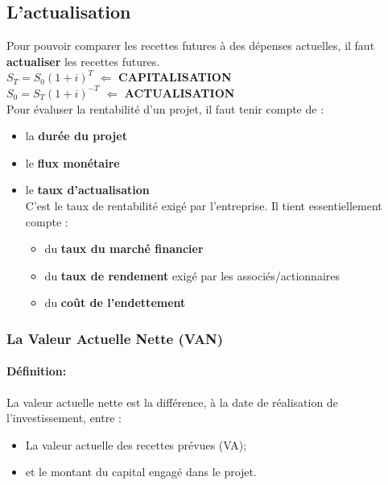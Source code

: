 \documentclass{article}
\begin{document}
\subsection{L'actualisation}
Pour pouvoir comparer les recettes futures à des dépenses actuelles, il faut \textbf{actualiser} les recettes futures.\\

$S_{T} = S_{0}(1+i)^{T}$ $\Longleftarrow$ \textbf{CAPITALISATION}\\
$S_{0} = S_{T}(1+i)^{-T}$ $\Longleftarrow$ \textbf{ACTUALISATION}\\

Pour évaluser la rentabilité d'un projet, il faut tenir compte de :
\begin{itemize}
	\item la \textbf{durée du projet}
	
	\item le \textbf{flux monétaire}
	
	\item le \textbf{taux d'actualisation}\\
	C'est le taux de rentabilité exigé par l'entreprise. Il tient essentiellement compte :
	\begin{itemize}
		\item du \textbf{taux du marché financier}
		\item du \textbf{taux de rendement} exigé par les associés/actionnaires
		\item du \textbf{co\^ut de l'endettement}
	\end{itemize}
\end{itemize}

\subsubsection{La Valeur Actuelle Nette (VAN)}

\paragraph{Définition:} La valeur actuelle nette est la différence, à la date de réalisation de l'investissement, entre :
\begin{itemize}
	\item La valeur actuelle des recettes prévues (VA);
	\item et le montant du capital engagé dans le projet.\\
\end{itemize}
\end{document}
